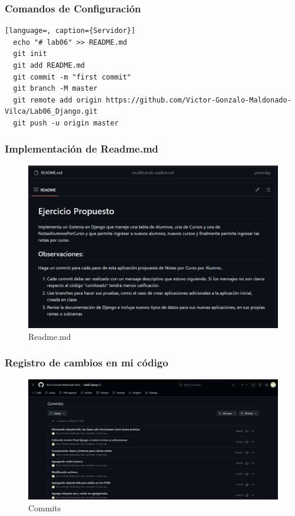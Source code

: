 \documentclass{article}
\begin{document}
	
  \subsubsection{Comandos de Configuración}
  \begin{lstlisting}[language=, caption={Servidor}]
  echo "# lab06" >> README.md
  git init
  git add README.md
  git commit -m "first commit"
  git branch -M master
  git remote add origin https://github.com/Victor-Gonzalo-Maldonado-Vilca/Lab06_Django.git
  git push -u origin master
  \end{lstlisting}
  
  
  \subsubsection{Implementación de Readme.md}
  \begin{figure}[H]
    \centering
    \includegraphics[width=1\textwidth, keepaspectratio]{img/readme.png}
    \caption{Readme.md}
  \end{figure}
  

	\subsubsection{Registro de cambios en mi código}
  \begin{figure}[H]
    \centering
    \includegraphics[width=1\textwidth, keepaspectratio]{img/commits.png}
    \caption{Commits}
  \end{figure}
	
\end{document}
